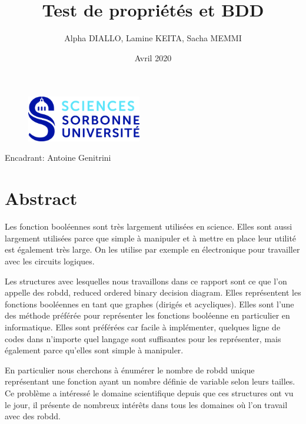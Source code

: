 \documentclass[french]{article}
\title{Test de propriétés et BDD}
\author{Alpha DIALLO, Lamine KEITA, Sacha MEMMI}
\date{Avril 2020}
\begin{document}
\maketitle
\begin{figure}[htp]
    \centering
    \includegraphics[width=5cm, height=2cm]{logo_upmc}
    \label{fig:logo}
\end{figure}

\begin{large}
\begin{center}
    Encadrant: Antoine Genitrini
\end{center}
\vfill
\begin{flushright}
\medskip

\medskip

\medskip

\end{flushright}
\end{large}


\newpage
\tableofcontents
\newpage
\section{Abstract}


Les fonction booléennes sont très largement utilisées en science. Elles sont aussi largement utilisées parce que simple à manipuler et à mettre en place leur utilité est également très large. On les utilise par exemple en électronique pour travailler avec les circuits logiques.
\vspace{5mm} 

Les structures avec lesquelles nous travaillons dans ce rapport sont ce que l'on appelle des robdd, reduced ordered binary decision diagram. Elles représentent les fonctions booléennes en tant que graphes (dirigés et acycliques). Elles sont l'une des méthode préférée pour représenter les fonctions booléenne en particulier en informatique. Elles sont préférées car facile à implémenter, quelques ligne de codes dans n'importe quel langage sont suffisantes pour les représenter, mais également parce qu'elles sont simple à manipuler.
\vspace{5mm} 

En particulier nous cherchons à énumérer le nombre de robdd unique représentant une fonction ayant un nombre définie de variable selon leurs tailles. Ce problème a intéressé le domaine scientifique depuis que ces structures ont vu le jour, il présente de nombreux intérêts dans tous les domaines où l'on travail avec des robdd.
\vspace{5mm} 
\end{document}
